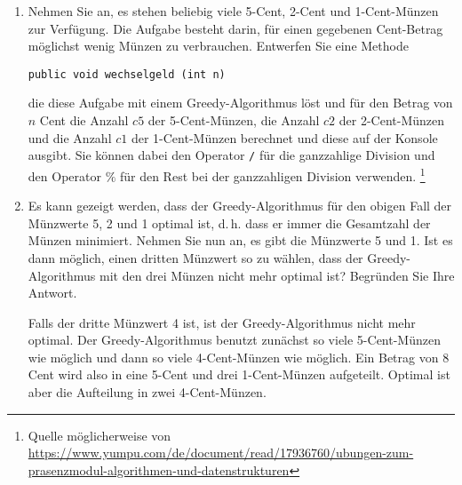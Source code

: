 \documentclass{lehramt-informatik}
\begin{document}
\begin{enumerate}


\item Nehmen Sie an, es stehen beliebig viele 5-Cent, 2-Cent und
1-Cent-Münzen zur Verfügung. Die Aufgabe besteht darin, für einen
gegebenen Cent-Betrag möglichst wenig Münzen zu verbrauchen. Entwerfen
Sie eine Methode

\begin{verbatim}
public void wechselgeld (int n)
\end{verbatim}

die diese Aufgabe mit einem Greedy-Algorithmus löst und für den Betrag
von $n$ Cent die Anzahl $c5$ der 5-Cent-Münzen, die Anzahl $c2$ der
2-Cent-Münzen und die Anzahl $c1$ der 1-Cent-Münzen berechnet und diese
auf der Konsole ausgibt. Sie können dabei den Operator \texttt{/} für
die ganzzahlige Division und den Operator $\%$ für den Rest bei der
ganzzahligen Division verwenden.
\footnote{Quelle möglicherweise von \url{https://www.yumpu.com/de/document/read/17936760/ubungen-zum-prasenzmodul-algorithmen-und-datenstrukturen}}

\begin{antwort}
\end{antwort}


\item Es kann gezeigt werden, dass der Greedy-Algorithmus für den obigen
Fall der Münzwerte 5, 2 und 1 optimal ist, d.\,h. dass er immer die
Gesamtzahl der Münzen minimiert. Nehmen Sie nun an, es gibt die
Münzwerte 5 und 1. Ist es dann möglich, einen dritten Münzwert so zu
wählen, dass der Greedy-Algorithmus mit den drei Münzen nicht mehr
optimal ist? Begründen Sie Ihre Antwort.

\begin{antwort}
Falls der dritte Münzwert 4 ist, ist der Greedy-Algorithmus nicht mehr
optimal. Der Greedy-Algorithmus benutzt zunächst so viele 5-Cent-Münzen
wie möglich und dann so viele 4-Cent-Münzen wie möglich. Ein Betrag von
8 Cent wird also in eine 5-Cent und drei 1-Cent-Münzen aufgeteilt.
Optimal ist aber die Aufteilung in zwei 4-Cent-Münzen.
\end{antwort}

%


\end{enumerate}
\end{document}

